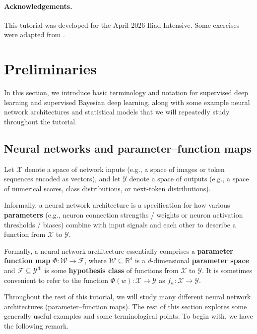 \documentclass[11pt]{article}
\newcommand{\R}{\mathbb{R}}
\newcommand{\X}{\mathcal{X}}
\newcommand{\Y}{\mathcal{Y}}
\newcommand{\W}{\mathcal{W}}
\newcommand{\F}{\mathcal{F}}
\begin{document}
\paragraph{Acknowledgements.}

This tutorial was developed for the April 2026 Iliad Intensive.
Some exercises were adapted from \citet{Furman2024}.

\clearpage
\section{Preliminaries}
\label{sec:prelims}

In this section, we introduce basic terminology and notation for supervised
deep learning and supervised Bayesian deep learning, along with some example
neural network architectures and statistical models that we will repeatedly
study throughout the tutorial.

\subsection{Neural networks and parameter--function maps}

Let $\X$ denote a space of network inputs (e.g., a space of images or token
sequences encoded as vectors), and let $\Y$ denote a space of outputs (e.g., a
space of numerical scores, class distributions, or next-token distributions).

Informally, a neural network architecture is a specification for how various
\textbf{parameters} (e.g., neuron connection strengths / weights or neuron
activation thresholds / biases) combine with input signals and each other to
describe a function from $\X$ to $\Y$.

Formally, a neural network architecture essentially comprises a
\textbf{parameter--function map}
    $\Phi : \W \to \F$, where
$\W \subseteq \R^d$ is a $d$-dimensional \textbf{parameter space} and 
$\F \subseteq \Y^\X$ is some \textbf{hypothesis class} of functions from $\X$
to $\Y$.
%
It is sometimes convenient to refer to the function $\Phi(w) : \X \to \Y$ as
$f_w : \X \to \Y$.

Throughout the rest of this tutorial, we will study many different neural
network architectures (parameter--function maps). The rest of this section
explores some generally useful examples and some terminological points. To
begin with, we have the following remark.
\end{document}
